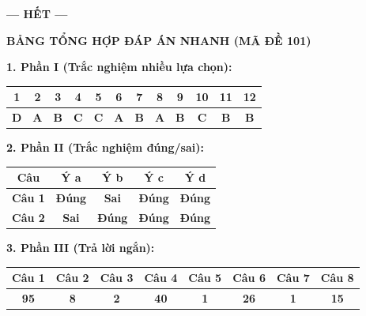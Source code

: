 \documentclass[11pt,a4paper]{article}
\begin{document}
\begin{center}
\textbf{--- HẾT ---}
\end{center}

\vspace{8pt}
\begin{center}
{\color{red!80!black}\large\bfseries BẢNG TỔNG HỢP ĐÁP ÁN NHANH (MÃ ĐỀ 101)}
\end{center}

\textbf{\color{myGreen} 1. Phần I (Trắc nghiệm nhiều lựa chọn):}
\begin{center}
\begin{tabular}{|*{12}{c|}}
\hline
\textbf{1} & \textbf{2} & \textbf{3} & \textbf{4} & \textbf{5} & \textbf{6} & \textbf{7} & \textbf{8} & \textbf{9} & \textbf{10} & \textbf{11} & \textbf{12} \\
\hline
\textbf{\color{red} D} & \textbf{\color{red} A} & \textbf{\color{red} B} & \textbf{\color{red} C} & \textbf{\color{red} C} & \textbf{\color{red} A} & \textbf{\color{red} B} & \textbf{\color{red} A} & \textbf{\color{red} B} & \textbf{\color{red} C} & \textbf{\color{red} B} & \textbf{\color{red} B} \\
\hline
\end{tabular}
\end{center}

\textbf{\color{myGreen} 2. Phần II (Trắc nghiệm đúng/sai):}
\begin{center}
\begin{tabular}{|c|c|c|c|c|}
\hline
\textbf{Câu} & \textbf{Ý a} & \textbf{Ý b} & \textbf{Ý c} & \textbf{Ý d} \\
\hline
\textbf{Câu 1} & \textbf{\color{red} Đúng} & \textbf{\color{mySub} Sai} & \textbf{\color{red} Đúng} & \textbf{\color{red} Đúng} \\
\hline
\textbf{Câu 2} & \textbf{\color{mySub} Sai} & \textbf{\color{red} Đúng} & \textbf{\color{red} Đúng} & \textbf{\color{red} Đúng} \\
\hline
\end{tabular}
\end{center}

\textbf{\color{myGreen} 3. Phần III (Trả lời ngắn):}
\begin{center}
\begin{tabular}{|*{8}{c|}}
\hline
\textbf{Câu 1} & \textbf{Câu 2} & \textbf{Câu 3} & \textbf{Câu 4} & \textbf{Câu 5} & \textbf{Câu 6} & \textbf{Câu 7} & \textbf{Câu 8} \\
\hline
\textbf{\color{red} 95} & \textbf{\color{red} 8} & \textbf{\color{red} 2} & \textbf{\color{red} 40} & \textbf{\color{red} 1} & \textbf{\color{red} 26} & \textbf{\color{red} 1} & \textbf{\color{red} 15} \\
\hline
\end{tabular}
\end{center}
\end{document}
